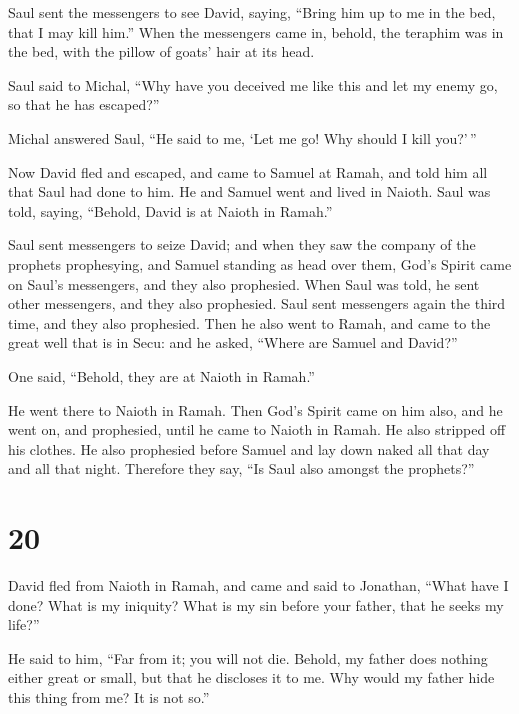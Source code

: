  Saul sent the messengers to see David, saying, ``Bring
him up to me in the bed, that I may kill him.''  When the
messengers came in, behold, the teraphim was in the bed, with the pillow
of goats' hair at its head.

 Saul said to Michal, ``Why have you deceived me like
this and let my enemy go, so that he has escaped?''

Michal answered Saul, ``He said to me, `Let me go! Why should I kill
you?'\,''

 Now David fled and escaped, and came to Samuel at Ramah,
and told him all that Saul had done to him. He and Samuel went and lived
in Naioth.  Saul was told, saying, ``Behold, David is at
Naioth in Ramah.''

 Saul sent messengers to seize David; and when they saw
the company of the prophets prophesying, and Samuel standing as head
over them, God's Spirit came on Saul's messengers, and they also
prophesied.  When Saul was told, he sent other
messengers, and they also prophesied. Saul sent messengers again the
third time, and they also prophesied.  Then he also went
to Ramah, and came to the great well that is in Secu: and he asked,
``Where are Samuel and David?''

One said, ``Behold, they are at Naioth in Ramah.''

 He went there to Naioth in Ramah. Then God's Spirit came
on him also, and he went on, and prophesied, until he came to Naioth in
Ramah.  He also stripped off his clothes. He also
prophesied before Samuel and lay down naked all that day and all that
night. Therefore they say, ``Is Saul also amongst the prophets?''

\hypertarget{section-19}{%
\section{20}\label{section-19}}

 David fled from Naioth in Ramah, and came and said to
Jonathan, ``What have I done? What is my iniquity? What is my sin before
your father, that he seeks my life?''

 He said to him, ``Far from it; you will not die. Behold,
my father does nothing either great or small, but that he discloses it
to me. Why would my father hide this thing from me? It is not so.''

